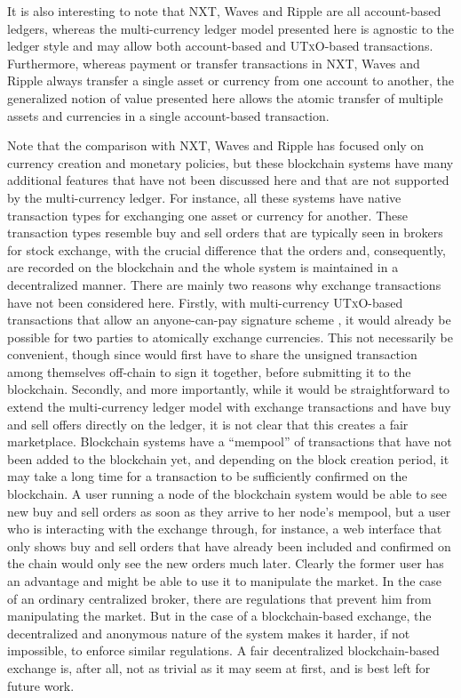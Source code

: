 \documentclass{llncs}
\newcommand{\utxo}{\textsc{UTxO}\xspace}
\begin{document}
It is also interesting to note that NXT, Waves and Ripple are all account-based ledgers, whereas the multi-currency ledger model presented here is agnostic to the ledger style and may allow both account-based and \utxo-based transactions. Furthermore, whereas payment or transfer transactions in NXT, Waves and Ripple always transfer a single asset or currency from one account to another, the generalized notion of value presented here allows the atomic transfer of multiple assets and currencies in a single account-based transaction.

Note that the comparison with NXT, Waves and Ripple has focused only on currency creation and monetary policies, but these blockchain systems have many additional features that have not been discussed here and that are not supported by the multi-currency ledger. For instance, all these systems have native transaction types for exchanging one asset or currency for another. These transaction types resemble buy and sell orders that are typically seen in brokers for stock exchange, with the crucial difference that the orders and, consequently, are recorded on the blockchain and the whole system is maintained in a decentralized manner. There are mainly two reasons why exchange transactions have not been considered here. Firstly, with multi-currency \utxo-based transactions that allow an anyone-can-pay signature scheme \cite{OpCheckSig}, it would already be possible for two parties to atomically exchange currencies. This not necessarily be convenient, though since would first have to share the unsigned transaction among themselves off-chain to sign it together, before submitting it to the blockchain. Secondly, and more importantly, while it would be straightforward to extend the multi-currency ledger model with exchange transactions and have buy and sell offers directly on the ledger, it is not clear that this creates a fair marketplace. Blockchain systems have a ``mempool'' of transactions that have not been added to the blockchain yet, and depending on the block creation period, it may take a long time for a transaction to be sufficiently confirmed on the blockchain. A user running a node of the blockchain system would be able to see new buy and sell orders as soon as they arrive to her node's mempool, but a user who is interacting with the exchange through, for instance, a web interface that only shows buy and sell orders that have already been included and confirmed on the chain would only see the new orders much later. Clearly the former user has an advantage and might be able to use it to manipulate the market. In the case of an ordinary centralized broker, there are regulations that prevent him from manipulating the market. But in the case of a blockchain-based exchange, the decentralized and anonymous nature of the system makes it harder, if not impossible, to enforce similar regulations. A fair decentralized blockchain-based exchange is, after all, not as trivial as it may seem at first, and is best left for future work.
\end{document}
